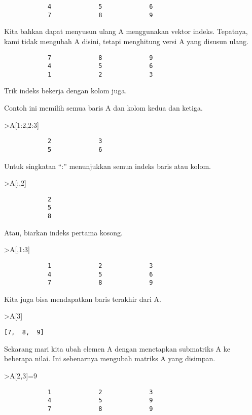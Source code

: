 \documentclass[
]{book}
\begin{document}
\begin{verbatim}
            4             5             6 
            7             8             9 
\end{verbatim}

Kita bahkan dapat menyusun ulang A menggunakan vektor indeks. Tepatnya, kami tidak mengubah A disini, tetapi menghitung versi A yang disusun ulang.

\begin{verbatim}
            7             8             9 
            4             5             6 
            1             2             3 
\end{verbatim}

Trik indeks bekerja dengan kolom juga.

Contoh ini memilih semua baris A dan kolom kedua dan ketiga.

\textgreater A{[}1:2,2:3{]}

\begin{verbatim}
            2             3 
            5             6 
\end{verbatim}

Untuk singkatan ``:'' menunjukkan semua indeks baris atau kolom.

\textgreater A{[}:,2{]}

\begin{verbatim}
            2 
            5 
            8 
\end{verbatim}

Atau, biarkan indeks pertama kosong.

\textgreater A{[},1:3{]}

\begin{verbatim}
            1             2             3 
            4             5             6 
            7             8             9 
\end{verbatim}

Kita juga bisa mendapatkan baris terakhir dari A.

\textgreater A{[}3{]}

\begin{verbatim}
[7,  8,  9]
\end{verbatim}

Sekarang mari kita ubah elemen A dengan menetapkan submatriks A ke beberapa nilai. Ini sebenarnya mengubah matriks A yang disimpan.

\textgreater A{[}2,3{]}=9

\begin{verbatim}
            1             2             3 
            4             5             9 
            7             8             9 
\end{verbatim}
\end{document}
